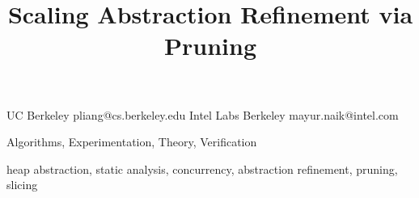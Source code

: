 \documentclass[9pt]{sigplanconf}
\begin{document}


\title{Scaling Abstraction Refinement via Pruning}

           {UC  Berkeley}
           {pliang@cs.berkeley.edu}
           {Intel Labs Berkeley}
           {mayur.naik@intel.com}




\maketitle




\terms
Algorithms, Experimentation, Theory, Verification

\keywords
heap abstraction, static analysis, concurrency, abstraction refinement, pruning, slicing














\end{document}
